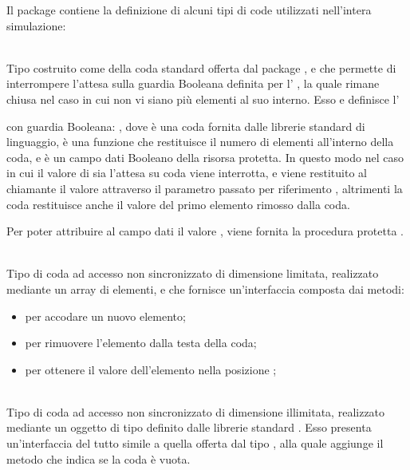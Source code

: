 	Il package  contiene la definizione di alcuni tipi di code utilizzati nell'intera simulazione:
		\begin{description}
			\item {} \\
			Tipo  costruito come  della coda standard offerta dal package , e che permette di interrompere l'attesa sulla guardia Booleana definita per l' , la quale rimane chiusa nel caso in cui non vi siano più elementi al suo interno.
			Esso e definisce l'
			\begin{center}
			\end{center}
		
		con guardia Booleana: , dove  è una coda fornita dalle librerie standard di linguaggio,  è una funzione che restituisce il numero di elementi all'interno della coda, e  è un campo dati Booleano della risorsa protetta. In questo modo nel caso in cui il valore di  sia  l'attesa su coda viene interrotta, e viene restituito al chiamante il valore  attraverso il parametro passato per riferimento , altrimenti la coda restituisce anche il valore del primo elemento rimosso dalla coda.
		
		Per poter attribuire al campo dati  il valore , viene fornita la procedura protetta .
			
			\item {} \\
			Tipo di coda ad accesso non sincronizzato di dimensione limitata, realizzato mediante un array di elementi, e che fornisce un'interfaccia composta dai metodi:
			\begin{itemize}
				\item {} per accodare un nuovo elemento;
				\item {} per rimuovere l'elemento dalla testa della coda;
				\item {} per ottenere il valore dell'elemento nella posizione ;
			\end{itemize}
			
			\item {} \\
			Tipo di coda ad accesso non sincronizzato di dimensione illimitata, realizzato mediante un oggetto di tipo  definito dalle librerie standard . Esso presenta un'interfaccia del tutto simile a quella offerta dal tipo , alla quale aggiunge il metodo  che indica se la coda è vuota. 
			
		\end{description}
	
